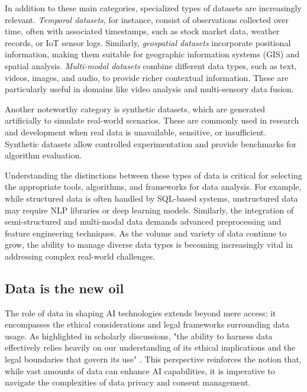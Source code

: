 In addition to these main categories, specialized types of datasets are increasingly relevant. \textit{Temporal datasets}, for instance, consist of observations collected over time, often with associated timestamps, such as stock market data, weather records, or IoT sensor logs. Similarly, \textit{geospatial datasets} incorporate positional information, making them suitable for geographic information systems (GIS) and spatial analysis. \textit{Multi-modal datasets} combine different data types, such as text, videos, images, and audio, to provide richer contextual information. These are particularly useful in domains like video analysis and multi-sensory data fusion.

Another noteworthy category is synthetic datasets, which are generated artificially to simulate real-world scenarios. These are commonly used in research and development when real data is unavailable, sensitive, or insufficient. Synthetic datasets allow controlled experimentation and provide benchmarks for algorithm evaluation.

Understanding the distinctions between these types of data is critical for selecting the appropriate tools, algorithms, and frameworks for data analysis. For example, while structured data is often handled by SQL-based systems, unstructured data may require NLP libraries or deep learning models. Similarly, the integration of semi-structured and multi-modal data demands advanced preprocessing and feature engineering techniques. As the volume and variety of data continue to grow, the ability to manage diverse data types is becoming increasingly vital in addressing complex real-world challenges.
\subsection{Data is the new oil}
The role of data in shaping AI technologies extends beyond mere access; it encompasses the ethical considerations and legal frameworks surrounding data usage. As highlighted in scholarly discussions, "the ability to harness data effectively relies heavily on our understanding of its ethical implications and the legal boundaries that govern its use" \cite{1}. This perspective reinforces the notion that, while vast amounts of data can enhance AI capabilities, it is imperative to navigate the complexities of data privacy and consent management. 

